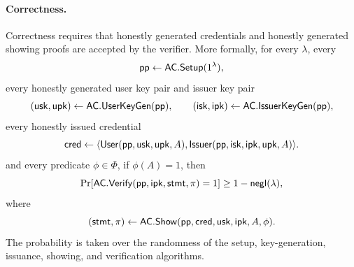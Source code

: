 \paragraph{Correctness.}
Correctness requires that honestly generated credentials and honestly generated showing proofs are accepted by the verifier. More formally, for every \(\lambda\), every
\begin{equation*}
  \mathsf{pp} \leftarrow \mathsf{AC}.\mathsf{Setup}(1^\lambda),
\end{equation*}
every honestly generated user key pair and issuer key pair
\begin{equation*}
  (\mathsf{usk},\mathsf{upk}) \leftarrow \mathsf{AC}.\mathsf{UserKeyGen}(\mathsf{pp}),
  \qquad
  (\mathsf{isk},\mathsf{ipk}) \leftarrow \mathsf{AC}.\mathsf{IssuerKeyGen}(\mathsf{pp}),
\end{equation*}
every honestly issued credential
\begin{equation*}
  \mathsf{cred}
  \leftarrow
  \langle
  \mathsf{User}(\mathsf{pp},\mathsf{usk},\mathsf{upk},A),
  \mathsf{Issuer}(\mathsf{pp},\mathsf{isk},\mathsf{ipk},\mathsf{upk},A)
  \rangle.
\end{equation*}
and every predicate \(\phi\in\Phi\), if \(\phi(A)=1\), then
\begin{equation*}
  \Pr[
    \mathsf{AC}.\mathsf{Verify}(\mathsf{pp},\mathsf{ipk},\mathsf{stmt},\pi)=1
  ]
  \geq 1-\mathsf{negl}(\lambda),
\end{equation*}
where
\begin{equation*}
  (\mathsf{stmt},\pi)
  \leftarrow
  \mathsf{AC}.\mathsf{Show}(\mathsf{pp},\mathsf{cred},\mathsf{usk},\mathsf{ipk},A,\phi).
\end{equation*}
The probability is taken over the randomness of the setup, key-generation, issuance, showing, and verification algorithms.

